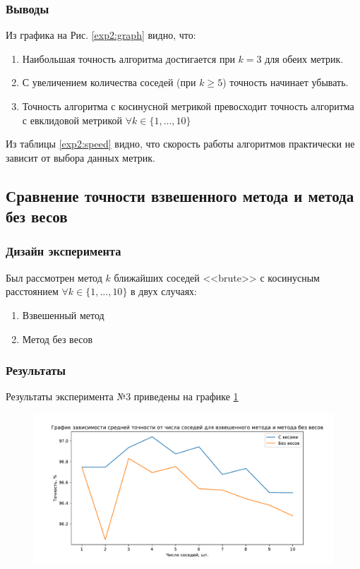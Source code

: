 \documentclass[a4paper, 11pt]{article}
\begin{document}
    \subsubsection{Выводы}
    Из графика на Рис. \ref{exp2:graph} видно, что:
        \begin{enumerate}
            \item Наибольшая точность алгоритма достигается при $k = 3$ для обеих метрик.
            \item С увеличением количества соседей (при $k \ge 5$) точность начинает убывать.
            \item Точность алгоритма с косинусной метрикой превосходит точность алгоритма с евклидовой метрикой $\forall k \in \{1, \dots, 10\}$  
        \end{enumerate} 
    
    Из таблицы \ref{exp2:speed} видно, что скорость работы алгоритмов практически не зависит от выбора данных метрик.
    \subsection{Сравнение точности взвешенного метода и метода без весов}
    \subsubsection{Дизайн эксперимента}
    Был рассмотрен метод $k$ ближайших соседей <<brute>> с косинусным расстоянием $\forall k \in \{1, \dots, 10\}$ в двух случаях:
        \begin{enumerate}
            \item Взвешенный метод
            \item Метод без весов
        \end{enumerate}
    \subsubsection{Результаты}
    Результаты эксперимента №3 приведены на графике \ref{exp3:graph}
    \begin{figure}[h]
        \caption{}\label{exp3:graph}
        \includegraphics[width=\textwidth]{../experiment3_graph.pdf}
    \end{figure} 
\end{document}
